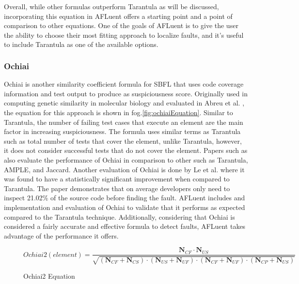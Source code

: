 Overall, while other formulas outperform Tarantula as will be discussed,
incorporating this equation in AFLuent offers a starting point and a point of
comparison to other equations. One of the goals of AFLuent is to give the user
the ability to choose their most fitting approach to localize faults, and it's
useful to include Tarantula as one of the available options.

\subsubsection{Ochiai}
\label{subsubsec:ochiai_lit}

Ochiai is another similarity coefficient formula for SBFL that uses code
coverage information and test output to produce as suspiciousness score.
Originally used in computing genetic similarity in molecular biology and
evaluated in Abreu et al. \cite{Abreu2006Ochiai}, the equation for this approach
is shown in fog.\ref{fig:ochiaiEquation}. Similar to Tarantula, the number of
failing test cases that execute an element are the main factor in increasing
suspiciousness. The formula uses similar terms as Tarantula such as total number
of tests that cover the element, unlike Tarantula, however, it does not consider
successful tests that do not cover the element.
Papers such as \cite{Abreu2006Ochiai,ABREU20091780} also evaluate the
performance of Ochiai in comparison to other such as Tarantula, AMPLE, and
Jaccard. Another evaluation of Ochiai is done by Le et al. \cite{le2013theory}
where it was found to have a statistically significant improvement when compared
to Tarantula. The paper demonstrates that on average developers only need to
inspect 21.02\% of the source code before finding the fault.
AFLuent includes and implementation and evaluation of Ochiai to
validate that it performs as expected compared to the Tarantula technique.
Additionally, considering that Ochiai is considered a fairly accurate and
effective formula to detect faults, AFLuent takes advantage of the performance
it offers.

\begin{figure}[!htb]
	\begin{center}
		\begin{equation}
			Ochiai2(element) = \frac{\textbf{N$_{CF}$}\cdot{\textbf{N$_{US}$}}}{\sqrt{(\textbf{N$_{CF}$}  + \textbf{N$_{CS}$}) \cdot (\textbf{N$_{US}$}  + \textbf{N$_{UF}$}) \cdot (\textbf{N$_{CF}$}  + \textbf{N$_{UF}$}) \cdot (\textbf{N$_{CP}$}  + \textbf{N$_{US}$})}}
		\end{equation}
		\caption{\label{fig:ochiai2Equation} Ochiai2 Equation\cite{wong2016survey}}
	\end{center}
\end{figure}

